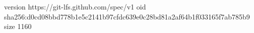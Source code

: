version https://git-lfs.github.com/spec/v1
oid sha256:d0cd08bbd778b1e5c2141b97cfdc639e0c28bd81a2af64b1f033165f7ab785b9
size 1160
